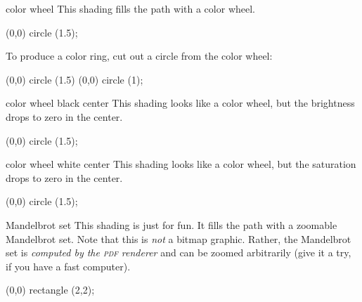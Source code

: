 \begin{shading}{color wheel}
  \label{shading-color-wheel}
  This shading fills the path with a color wheel.
\begin{codeexample}[]
\tikz \shade[shading=color wheel] (0,0) circle (1.5);
\end{codeexample}
  To produce a color ring, cut out a circle from the color wheel:
\begin{codeexample}[]
\tikz {}
  (0,0) circle (1.5)
  (0,0) circle (1);
\end{codeexample}
\end{shading}


\begin{shading}{color wheel black center}
  This shading looks like a color wheel, but the brightness drops to
  zero in the center.
\begin{codeexample}[]
\tikz \shade[shading=color wheel black center] (0,0) circle (1.5);
\end{codeexample}
\end{shading}


\begin{shading}{color wheel white center}
  This shading looks like a color wheel, but the saturation drops to
  zero in the center.
\begin{codeexample}[]
\tikz \shade[shading=color wheel white center] (0,0) circle (1.5);
\end{codeexample}
\end{shading}



\begin{shading}{Mandelbrot set}
  This shading is just for fun. It fills the path with a zoomable
  Mandelbrot set. Note that this is \emph{not} a bitmap
  graphic. Rather, the Mandelbrot set is \emph{computed by the
    \textsc{pdf} renderer} and can be zoomed arbitrarily (give it a
  try, if you have a fast computer).

\begin{codeexample}[]
\tikz \shade[shading=Mandelbrot set] (0,0) rectangle (2,2);
\end{codeexample}
\end{shading}




